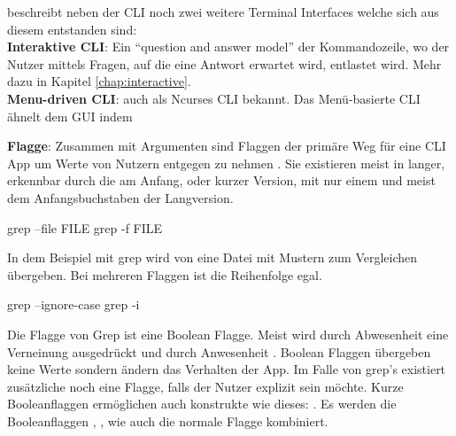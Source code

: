 \documentclass[oneside,bibliography=totocnumbered,BCOR=5mm]{scrbook}
\newenvironment{code}{\captionsetup{type=listing, skip=0pt}}{}
\begin{document}
\cite{Spolsky_2001} beschreibt neben der CLI noch zwei weitere Terminal Interfaces welche sich aus diesem entstanden sind:
\\
\textbf{Interaktive CLI}: Ein ``question and answer model'' \parencite[42]{Spolsky_2001} der Kommandozeile, wo der Nutzer mittels Fragen, auf die eine Antwort erwartet wird, entlastet wird. Mehr dazu in Kapitel \ref{chap:interactive}.
\\
\textbf{Menu-driven CLI}: auch als Ncurses CLI bekannt. Das Menü-basierte CLI ähnelt dem GUI indem


\textbf{Flagge}: Zusammen mit Argumenten sind Flaggen der primäre Weg für eine
CLI App um Werte von Nutzern entgegen zu nehmen \parencite{12factor}. Sie
existieren meist in langer, erkennbar durch die \codeinline{--} am Anfang, oder
kurzer Version, mit nur einem \codeinline{-} und meist dem Anfangsbuchstaben der
Langversion.

\begin{code}
\begin{shellcode}
grep --file FILE
grep -f FILE
\end{shellcode}
\medskip
\end{code}

In dem Beispiel mit grep wird von  eine Datei mit
Mustern zum Vergleichen übergeben. Bei mehreren Flaggen ist die Reihenfolge
egal.

\begin{code}
  \begin{shellcode}
  grep --ignore-case
  grep -i
  \end{shellcode}
  \medskip
\end{code}

Die  Flagge von Grep ist eine Boolean Flagge. Meist
wird durch Abwesenheit eine Verneinung ausgedrückt und durch Anwesenheit
. Boolean Flaggen übergeben keine Werte sondern ändern das
Verhalten der App. Im Falle von grep's  existiert
zusätzliche noch eine  Flagge, falls der Nutzer
explizit sein möchte. Kurze Booleanflaggen ermöglichen auch konstrukte
wie dieses: . Es werden die Booleanflaggen
, , wie auch die normale 
Flagge kombiniert.
\end{document}
